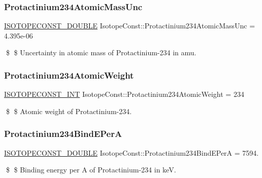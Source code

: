 \subsubsection{\texorpdfstring{Protactinium234\+Atomic\+Mass\+Unc}{Protactinium234AtomicMassUnc}}
{\footnotesize\ttfamily \mbox{\hyperlink{group___isotope_const-_macros_ga8f45a7272ce02c0b4c65c44636ed719a}{I\+S\+O\+T\+O\+P\+E\+C\+O\+N\+S\+T\+\_\+\+D\+O\+U\+B\+LE}} Isotope\+Const\+::\+Protactinium234\+Atomic\+Mass\+Unc = 4.\+395e-\/06}

\$ \$ Uncertainty in atomic mass of Protactinium-\/234 in amu. \mbox{\label{group___isotope_const-_protactinium-_pa234_ga91a80d09700534b1f9e13d9aad986bb1}} 
\subsubsection{\texorpdfstring{Protactinium234\+Atomic\+Weight}{Protactinium234AtomicWeight}}
{\footnotesize\ttfamily \mbox{\hyperlink{group___isotope_const-_macros_ga5f18360b3e99483a35c32d789e62621c}{I\+S\+O\+T\+O\+P\+E\+C\+O\+N\+S\+T\+\_\+\+I\+NT}} Isotope\+Const\+::\+Protactinium234\+Atomic\+Weight = 234}

\$ \$ Atomic weight of Protactinium-\/234. \mbox{\label{group___isotope_const-_protactinium-_pa234_ga239bc6579e6a541583bd4085097aefde}} 
\subsubsection{\texorpdfstring{Protactinium234\+Bind\+E\+PerA}{Protactinium234BindEPerA}}
{\footnotesize\ttfamily \mbox{\hyperlink{group___isotope_const-_macros_ga8f45a7272ce02c0b4c65c44636ed719a}{I\+S\+O\+T\+O\+P\+E\+C\+O\+N\+S\+T\+\_\+\+D\+O\+U\+B\+LE}} Isotope\+Const\+::\+Protactinium234\+Bind\+E\+PerA = 7594.}

\$ \$ Binding energy per A of Protactinium-\/234 in keV. \mbox{\label{group___isotope_const-_protactinium-_pa234_gac875ca673f7cb2ae1248c53bb59ce707}} 
